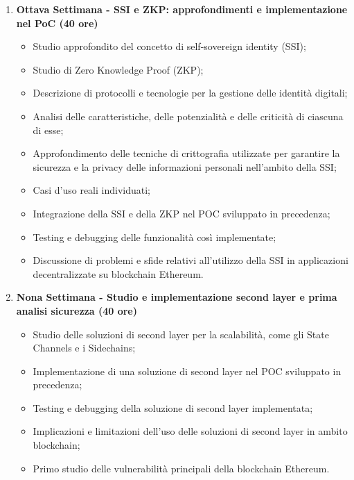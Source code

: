 {\begin{enumerate}
        \newpage

        \item \textbf{Ottava Settimana - SSI e ZKP: approfondimenti e implementazione nel PoC (40 ore)}
        \begin{itemize}
            \item Studio approfondito del concetto di self-sovereign identity (SSI);
            \item Studio di Zero Knowledge Proof (ZKP);
            \item Descrizione di protocolli e tecnologie per la gestione delle identità digitali;
            \item Analisi delle caratteristiche, delle potenzialità e delle criticità di ciascuna di esse;
            \item Approfondimento delle tecniche di crittografia utilizzate per garantire la sicurezza e la privacy delle informazioni personali nell'ambito della SSI;
            \item Casi d'uso reali individuati;
            \item Integrazione della SSI e della ZKP nel POC sviluppato in precedenza;
            \item Testing e debugging delle funzionalità così implementate;
            \item Discussione di problemi e sfide relativi all'utilizzo della SSI in applicazioni decentralizzate su blockchain Ethereum.
        \end{itemize}

        \item \textbf{Nona Settimana - Studio e implementazione second layer e prima analisi sicurezza (40 ore)}
        \begin{itemize}
            \item Studio delle soluzioni di second layer per la scalabilità, come gli State Channels e i Sidechains;
            \item Implementazione di una soluzione di second layer nel POC sviluppato in precedenza;
            \item Testing e debugging della soluzione di second layer implementata;
            \item Implicazioni e limitazioni dell'uso delle soluzioni di second layer in ambito blockchain;
            \item Primo studio delle vulnerabilità principali della blockchain Ethereum.
        \end{itemize}


\end{enumerate}}
